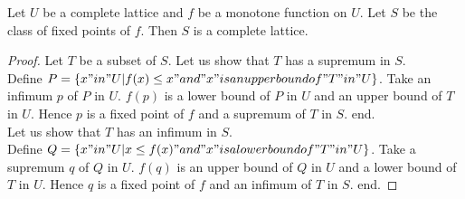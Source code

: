 \documentclass{article}
\begin{document}
  \begin{forthel}

    \begin{theorem}[KnasterTarski]
      Let $U$ be a complete lattice and $f$ be a monotone function on $U$.
      Let $S$ be the class of fixed points of $f$. Then $S$ is a complete lattice.
    \end{theorem}
    \begin{proof}
      Let $T$ be a subset of $S$.
      Let us show that $T$ has a supremum in $S$. \\
        Define $P = \{x "in" U | f(x) \leq x "and" x "is an upper bound of" T "in" U\}$.
        Take an infimum $p$ of $P$ in $U$. $f(p)$ is a lower bound of $P$ in $U$ and an upper bound of $T$ in $U$.
        Hence $p$ is a fixed point of $f$ and a supremum of $T$ in $S$.
      end. \\
      Let us show that $T$ has an infimum in $S$. \\
        Define $Q = \{x "in" U | x \leq f(x) "and" x "is a lower bound of" T "in" U\}$.
        Take a supremum $q$ of $Q$ in $U$. $f(q)$ is an upper bound of $Q$ in $U$ and a lower bound of $T$ in $U$.
        Hence $q$ is a fixed point of $f$ and an infimum of $T$ in $S$.
      end.
    \end{proof}
  \end{forthel}
\end{document}
